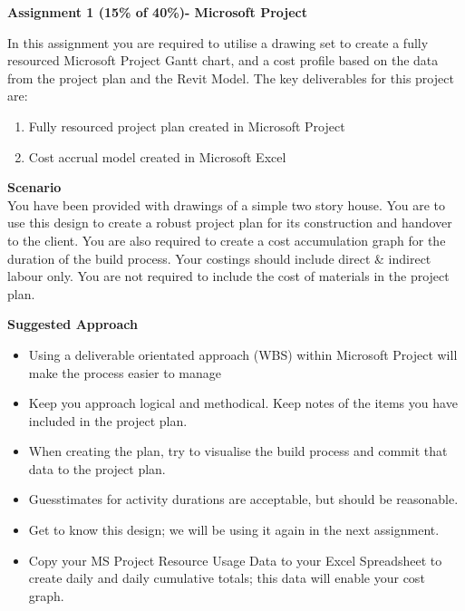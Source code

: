 
	
\begin{flushleft}
\Large\textbf{Assignment 1 (15\% of 40\%)- Microsoft Project}\\
\end{flushleft}

In this assignment you are required to utilise a drawing set to create a fully resourced Microsoft Project Gantt chart, and a cost profile based on the data from the project plan and the Revit Model.  The key deliverables for this project are:

\begin{enumerate}
	\item Fully resourced project plan created in Microsoft Project
	\item Cost accrual model created in Microsoft Excel
\end{enumerate}

\textbf{Scenario}\\


You have been provided with drawings of a simple two story house.  You are to use this design to create a robust project plan for its construction and handover to the client.  You are also required to create a cost accumulation graph for the duration of the build process.  Your costings should include direct \& indirect labour only.  You are not required to include the cost of materials in the project plan.


\vspace{.5cm}

\textbf{Suggested Approach}

\begin{itemize}
	\item Using a deliverable orientated approach (WBS) within Microsoft Project will make the process easier to manage
	\item Keep you approach logical and methodical.  Keep notes of the items you have included in the project plan.
	\item When creating the plan, try to visualise the build process and commit that data to the project plan.
	\item Guesstimates for activity durations are acceptable, but should be reasonable.
	\item Get to know this design; we will be using it again in the next assignment.
	\item Copy your MS Project Resource Usage Data to your Excel Spreadsheet to create daily and daily cumulative totals; this data will enable your cost graph.
\end{itemize}


